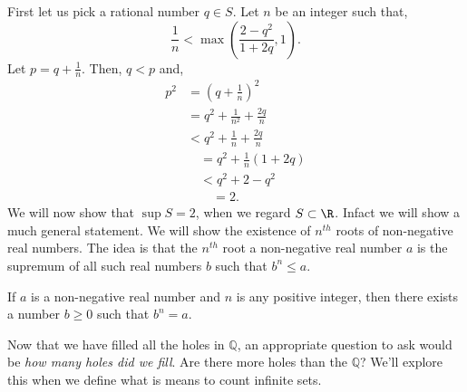 First let us pick a rational number $q \in S$. Let $n$ be an integer such that,
\[\frac{1}{n} < \max{(\frac{2-q^2}{1+2q},1)}.\]
Let $p = q + \frac{1}{n}$. Then, $q < p$ and,
\begin{align*}
    p^2 &= {(q + \frac{1}{n})}^2 \\
    & = q^2 + \frac{1}{n^2} + \frac{2q}{n}\\
    & < q^2 + \frac{1}{n} + \frac{2q}{n} \\
    &\quad = q^2 + \frac{1}{n}(1 + 2q)\\ 
    &\quad < q^2 + 2 - q^2\\
    &\quad\quad = 2.
\end{align*}
We will now show that $\sup{S} = 2$, when we regard $S \subset \R$. Infact we will show a much general
statement. We will show the existence of $n^{th}$ roots of non-negative real numbers. The idea is that the
$n^{th}$ root a non-negative real number $a$ is the supremum of all such real numbers $b$ such that 
$b^n \leq a$.
\begin{Theorem}
    If $a$ is a non-negative real number and $n$ is any positive integer, then there exists a number $b \geq
    0$ such that $b^n = a$.
\end{Theorem}


Now that we have filled all the holes in $\mathbb{Q}$, an appropriate question to ask would be
\emph{how many holes did we fill}. Are there more holes than the $\mathbb{Q}$? We'll explore this
when we define what is means to count infinite sets.

